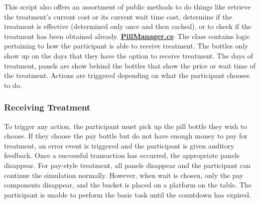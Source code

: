 \documentclass{article}
\begin{document}
This script also offers an assortment of public methods to do things like retrieve the treatment's current cost or its current wait time cost, determine if the treatment is effective (determined only once and then cached), or to check if the treatment has been obtained already. \newline \newline
\href{https://bit.ly/2JDPChz}{\textbf{PillManager.cs}}: The class contains logic pertaining to how the participant is able to receive treatment. The bottles only show up on the days that they have the option to receive treatment. The days of treatment, panels are show behind the bottles that show the price or wait time of the treatment. Actions are triggered depending on what the participant chooses to do.

\subsubsection*{Receiving Treatment} 
To trigger any action, the participant must pick up the pill bottle they wish to choose. If they choose the pay bottle but do not have enough money to pay for treatment, an error event is triggered and the participant is given auditory feedback. Once a successful transaction has occurred, the appropriate panels disappear. For pay-style treatment, all panels disappear and the participant can continue the simulation normally. However, when wait is chosen, only the pay components disappear, and the bucket is placed on a platform on the table. The participant is unable to perform the basic task until the countdown has expired.
\end{document}
